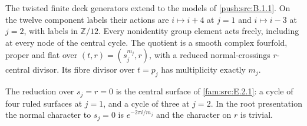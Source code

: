 \begin{theorem}\hypertarget{tag-0301}{}\label{push:src:B.1.2}\label{push:B12}

The twisted finite deck generators extend to the models of
\ref{push:src:B.1.1}. On the twelve component labels their actions are
$i\mapsto i+4$ at $j=1$ and $i\mapsto i-3$ at $j=2$,
with labels in $\mathbb Z/12$. Every nonidentity group
element acts freely, including at every node of the central
cycle. The quotient is a smooth complex fourfold, proper
and flat over $(t,r)=(s_j^{m_j},r)$, with a reduced
normal-crossings $r$-central divisor. Its fibre divisor
over $t=p_j$ has multiplicity exactly $m_j$.

The reduction over $s_j=r=0$ is the central surface of \cref{fam:src:E.2.1}:
a cycle of four ruled surfaces at $j=1$, and a cycle of
three at $j=2$. In the root presentation the normal
character to $s_j=0$ is $e^{-2\pi i/m_j}$ and the
character on $r$ is trivial.
\end{theorem}


